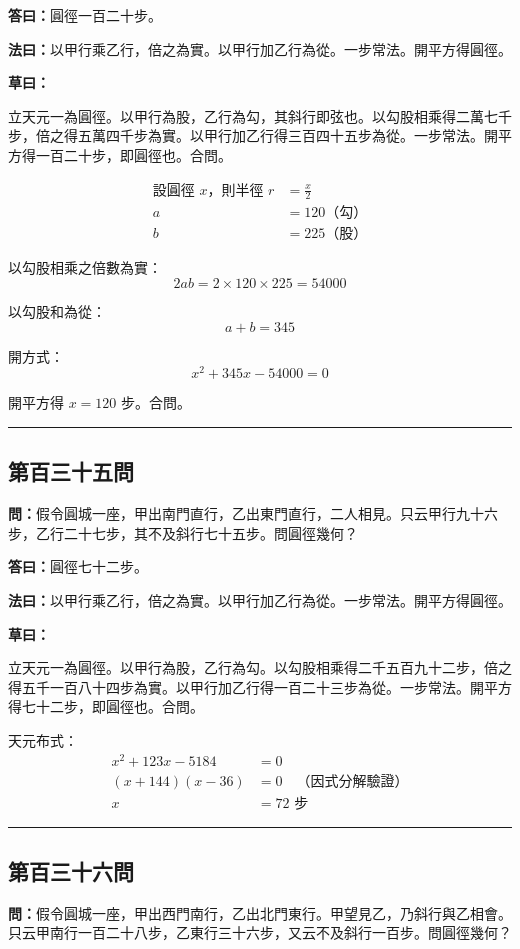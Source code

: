 \documentclass[11pt,a4paper]{article}
\newcommand{\longline}{\noindent\rule{\textwidth}{0.4pt}}
\newcommand{\wen}[1]{\par\noindent\textbf{\textcolor{probcolor}{問：}}{#1}\par}
\newcommand{\da}[1]{\par\noindent\textbf{\textcolor{anscolor}{答曰：}}{#1}\par}
\newcommand{\fayue}[1]{\par\noindent\textbf{\textcolor{methodcolor}{法曰：}}{#1}\par}
\newcommand{\caoyue}[1]{\par\noindent\textbf{草曰：}{#1}\par}
\begin{document}
\da{圓徑一百二十步。}

\fayue{以甲行乘乙行，倍之為實。以甲行加乙行為從。一步常法。開平方得圓徑。}

\caoyue{
立天元一為圓徑。以甲行為股，乙行為勾，其斜行即弦也。以勾股相乘得二萬七千步，倍之得五萬四千步為實。以甲行加乙行得三百四十五步為從。一步常法。開平方得一百二十步，即圓徑也。合問。

\begin{align*}
\text{設圓徑 } x \text{，則半徑 } r &= \frac{x}{2} \\
a &= 120 \text{（勾）} \\
b &= 225 \text{（股）}
\end{align*}

以勾股相乘之倍數為實：
$$2ab = 2 \times 120 \times 225 = 54000$$

以勾股和為從：
$$a + b = 345$$

開方式：
$$x^2 + 345x - 54000 = 0$$

開平方得 $x = 120$ 步。合問。
}

\vspace{0.5cm}
\longline

\subsection*{第百三十五問}
\wen{假令圓城一座，甲出南門直行，乙出東門直行，二人相見。只云甲行九十六步，乙行二十七步，其不及斜行七十五步。問圓徑幾何？}

\da{圓徑七十二步。}

\fayue{以甲行乘乙行，倍之為實。以甲行加乙行為從。一步常法。開平方得圓徑。}

\caoyue{
立天元一為圓徑。以甲行為股，乙行為勾。以勾股相乘得二千五百九十二步，倍之得五千一百八十四步為實。以甲行加乙行得一百二十三步為從。一步常法。開平方得七十二步，即圓徑也。合問。

天元布式：
\begin{align*}
x^2 + 123x - 5184 &= 0 \\
(x + 144)(x - 36) &= 0 \quad \text{（因式分解驗證）} \\
x &= 72 \text{ 步}
\end{align*}
}

\vspace{0.5cm}
\longline

\subsection*{第百三十六問}
\wen{假令圓城一座，甲出西門南行，乙出北門東行。甲望見乙，乃斜行與乙相會。只云甲南行一百二十八步，乙東行三十六步，又云不及斜行一百步。問圓徑幾何？}
\end{document}
